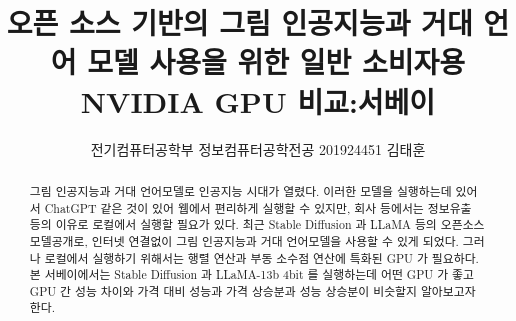 \documentclass{article}
\title{오픈 소스 기반의 그림 인공지능과 거대 언어 모델 사용을 위한 일반 소비자용 NVIDIA GPU 비교:서베이}
\author{전기컴퓨터공학부 정보컴퓨터공학전공 201924451 김태훈}
\begin{document}
\maketitle

\begin{abstract}
그림 인공지능과 거대 언어모델로 인공지능 시대가 열렸다. 이러한 모델을
실행하는데 있어서 ChatGPT 같은 것이 있어 웹에서 편리하게 실행할 수 있지만, 회사
등에서는 정보유출 등의 이유로 로컬에서 실행할 필요가 있다. 최근 Stable Diffusion 과
LLaMA 등의 오픈소스 모델공개로, 인터넷 연결없이 그림 인공지능과 거대 언어모델을
사용할 수 있게 되었다. 그러나 로컬에서 실행하기 위해서는 행렬 연산과 부동 소수점
연산에 특화된 GPU 가 필요하다. 본 서베이에서는 Stable Diffusion 과 LLaMA-13b 4bit 를
실행하는데 어떤 GPU 가 좋고 GPU 간 성능 차이와 가격 대비 성능과 가격 상승분과 성능
상승분이 비슷할지 알아보고자 한다.
\end{abstract}










\end{document}
